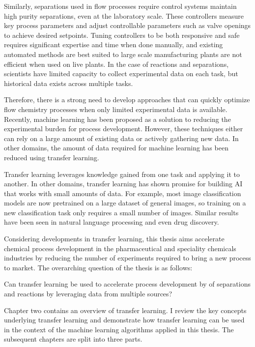 Similarly, separations used in flow processes require control systems maintain high purity separations, even at the laboratory scale. These controllers measure key process parameters and adjust controllable parameters such as valve openings to achieve desired setpoints. Tuning controllers to be both responsive and safe requires significant expertise and time when done manually, and existing automated methods are best suited to large scale manufacturing plants are not efficient when used on live plants. In the case of reactions and separations, scientists have limited capacity to collect experimental data on each task, but historical data exists across multiple tasks.

Therefore, there is a strong need to develop approaches that can quickly optimize flow chemistry processes when only limited experimental data is available. Recently, machine learning has been proposed as a solution to reducing the experimental burden for process development.  However, these techniques either can rely on a large amount of existing data or actively gathering new data.  In other domains, the amount of data required for machine learning has been reduced using transfer learning. 

Transfer learning leverages knowledge gained from one task and applying it to another. In other domains, transfer learning has shown promise for building AI that works with small amounts of data. For example, most image classification models are now pretrained on a large dataset of general images, so training on a new classification task only requires a small number of images. Similar results have been seen in natural language processing and even drug discovery. 

Considering developments in transfer learning, this thesis aims accelerate chemical process development in the pharmaceutical and speciality chemicals industries by reducing the number of experiments required to bring a new process to market. The overarching question of the thesis is as follows:

\begin{displayquote}
Can transfer learning be used to accelerate process development by of separations and reactions by leveraging data from multiple sources? 
\end{displayquote}


Chapter two contains an overview of transfer learning. I review the key concepts underlying transfer learning and demonstrate how transfer learning can be used in the context of the machine learning algorithms applied in this thesis.  The subsequent chapters are split into three parts.

